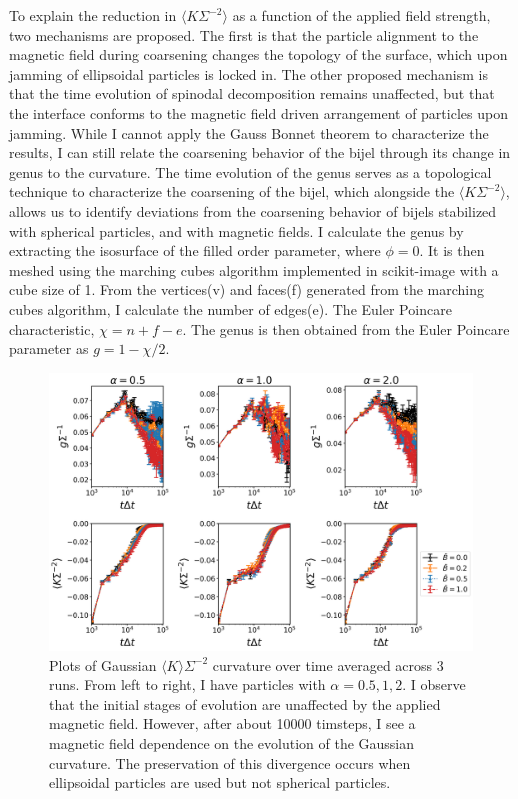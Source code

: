 To explain the reduction in $\langle K\Sigma^{-2} \rangle$ as a function of the applied field strength, two mechanisms are proposed. The first is that 
the particle alignment to the magnetic field during coarsening changes the topology of the surface, which upon jamming of ellipsoidal particles is locked in. 
The other proposed mechanism is that the time evolution of spinodal decomposition remains unaffected, but that the interface conforms to the magnetic field 
driven arrangement of particles upon jamming. While I cannot apply the Gauss Bonnet theorem to characterize the results, I can still relate the coarsening 
behavior of the bijel through its change in genus to the curvature. The time evolution of the genus serves as a topological technique to characterize the 
coarsening of the bijel, which alongside the $\langle K\Sigma^{-2} \rangle$, allows us to identify deviations from the coarsening behavior of bijels 
stabilized with spherical particles, and with magnetic fields. I calculate the genus by extracting the isosurface of the filled order parameter, where 
$\phi = 0$. It is then meshed using the marching cubes algorithm implemented in scikit-image with a cube size of 1. \cite{van2014scikit} From the vertices(v) 
and faces(f) generated from the marching cubes algorithm, I calculate the number of edges(e). The Euler Poincare characteristic, $\chi = n + f - e$. The genus is 
then obtained from the Euler Poincare parameter as $g = 1 - \chi/2$.

\begin{figure} 
    \centering 
    \includegraphics[scale = 0.4]{figures/results/paper1/genus_curvature_vs_coverage.png} 
    \caption{Plots of Gaussian $\langle K \rangle \Sigma^{-2}$ curvature over time averaged across 3 runs. 
    From left to right, I have particles with $\alpha = 0.5, 1, 2$. I observe that the initial stages of 
    evolution are unaffected by the applied magnetic field. However, after about 10000 timsteps, I see a 
    magnetic field dependence on the evolution of the Gaussian curvature. The preservation of this divergence 
    occurs when ellipsoidal particles are used but not spherical particles.} 
    \label{fig:curvature_vs_coverage}
\end{figure}

